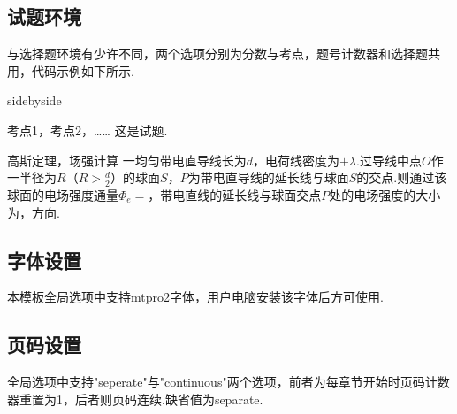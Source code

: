 {\subsection{试题环境}
与选择题环境有少许不同，两个选项分别为分数与考点，题号计数器和选择题共用，代码示例如下所示.
\begin{tcblisting}{sidebyside}
    \begin{exercise}{5}{考点1，考点2，……}
        这是试题.
    \end{exercise}
\end{tcblisting}
    \hspace{-2.16em}
    \begin{minipage}{0.67\textwidth}
        \vspace{1em}
    \begin{exercise}{6}{高斯定理，场强计算}
        一均匀带电直导线长为$d$，电荷线密度为$+\lambda$.过导线中点$O$作一半径为$R$（$R>\frac{d}{2}$）的球面$S$，$P$为带电直导线的延长线与球面$S$的交点.则通过该球面的电场强度通量$\Phi_e=$，带电直线的延长线与球面交点$P$处的电场强度的大小为，方向.
    \end{exercise}
    \end{minipage}
    \hfill
    \begin{minipage}[c]{0.33\textwidth}
    \begin{center}
    \end{center}
    \end{minipage}

\subsection{字体设置}
本模板全局选项中支持mtpro2字体，用户电脑安装该字体后方可使用.
\subsection{页码设置}
全局选项中支持"seperate"与"continuous"两个选项，前者为每章节开始时页码计数器重置为1，后者则页码连续.缺省值为separate.
}
\newpage
